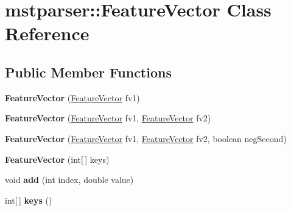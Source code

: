 \hypertarget{classmstparser_1_1FeatureVector}{
\section{mstparser::FeatureVector Class Reference}
\label{classmstparser_1_1FeatureVector}
}
\subsection*{Public Member Functions}
\begin{DoxyCompactItemize}
\item 
\hypertarget{classmstparser_1_1FeatureVector_a4db1d3d349787a9de99e90a3ddb41861}{
{\bfseries FeatureVector} (\hyperlink{classmstparser_1_1FeatureVector}{FeatureVector} fv1)}
\label{classmstparser_1_1FeatureVector_a4db1d3d349787a9de99e90a3ddb41861}

\item 
\hypertarget{classmstparser_1_1FeatureVector_a410affdb7255f09e7ed08bcf13337616}{
{\bfseries FeatureVector} (\hyperlink{classmstparser_1_1FeatureVector}{FeatureVector} fv1, \hyperlink{classmstparser_1_1FeatureVector}{FeatureVector} fv2)}
\label{classmstparser_1_1FeatureVector_a410affdb7255f09e7ed08bcf13337616}

\item 
\hypertarget{classmstparser_1_1FeatureVector_a3e682e5305bb45603d82e043a84a5584}{
{\bfseries FeatureVector} (\hyperlink{classmstparser_1_1FeatureVector}{FeatureVector} fv1, \hyperlink{classmstparser_1_1FeatureVector}{FeatureVector} fv2, boolean negSecond)}
\label{classmstparser_1_1FeatureVector_a3e682e5305bb45603d82e043a84a5584}

\item 
\hypertarget{classmstparser_1_1FeatureVector_aa886ae9e7e66c977b002d028e873e92e}{
{\bfseries FeatureVector} (int\mbox{[}$\,$\mbox{]} keys)}
\label{classmstparser_1_1FeatureVector_aa886ae9e7e66c977b002d028e873e92e}

\item 
\hypertarget{classmstparser_1_1FeatureVector_a659e5e70b3a7c13ecec5c8c5e92b69ab}{
void {\bfseries add} (int index, double value)}
\label{classmstparser_1_1FeatureVector_a659e5e70b3a7c13ecec5c8c5e92b69ab}

\item 
\hypertarget{classmstparser_1_1FeatureVector_a56d85b9111146943fc0aaaf82cf63075}{
int\mbox{[}$\,$\mbox{]} {\bfseries keys} ()}
\label{classmstparser_1_1FeatureVector_a56d85b9111146943fc0aaaf82cf63075}


\end{DoxyCompactItemize}
